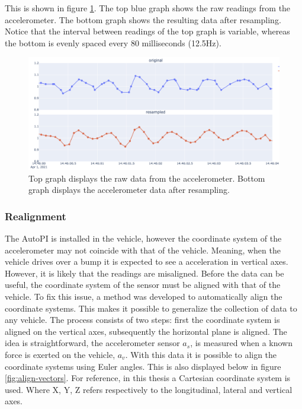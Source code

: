 This is shown in figure \ref{fig:accelerometer-resampling}. The top blue graph shows the raw readings from the accelerometer. The bottom graph shows the resulting data after resampling. Notice that the interval between readings of the top graph is variable, whereas the bottom is evenly spaced every 80 milliseconds (12.5Hz).

\begin{figure}[H]
\begin{center}
\includegraphics[width=\textwidth,keepaspectratio]{images/4_data/accelerometer-resampling.png}
\end{center}
\caption{Top graph displays the raw data from the accelerometer. Bottom graph displays the accelerometer data after resampling.}
\label{fig:accelerometer-resampling}
\end{figure}


\subsubsection{Realignment}
The AutoPI is installed in the vehicle, however the coordinate system of the accelerometer may not coincide with that of the vehicle. Meaning, when the vehicle drives over a bump it is expected to see a acceleration in vertical axes. However, it is likely that the readings are misaligned. Before the data can be useful, the coordinate system of the sensor must be aligned with that of the vehicle. To fix this issue, a method was developed to automatically align the coordinate systems. This makes it possible to generalize the collection of data to any vehicle. The process consists of two steps: first the coordinate system is aligned on the vertical axes, subsequently the horizontal plane is aligned. The idea is straightforward, the accelerometer sensor $a_s$, is measured when a known force is exerted on the vehicle, $a_v$. With this data it is possible to align the coordinate systems using Euler angles. This is also displayed below in figure \ref{fig:align-vectors}. For reference, in this thesis a Cartesian coordinate system is used. Where X, Y, Z refers respectively to the longitudinal, lateral and vertical axes.

